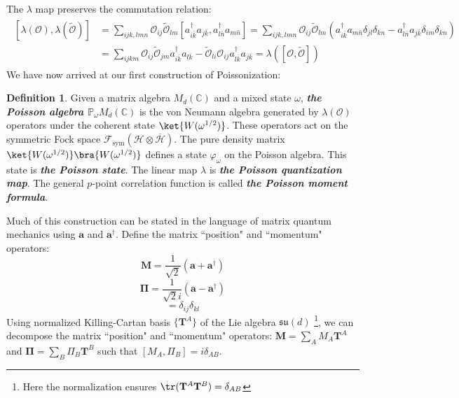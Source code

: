 \documentclass[a4paper,11pt]{article}
\theoremstyle{definition}
\newtheorem{definition}{Definition}[section]
\numberwithin{equation}{section}
\newcommand{\lb}{\left(}
\newcommand{\rb}{\right)}
\begin{document}
The $\lambda$ map preserves the commutation relation:
\begin{align}
    \begin{split}
        [\lambda(\mathcal{O}), \lambda(\widetilde{\mathcal{O}})] &= \sum_{ijk,lmn}\mathcal{O}_{ij}\widetilde{\mathcal{O}}_{lm}[a^\dagger_{i\bar{k}}a_{j\bar{k}}, a^\dagger_{l\bar{n}}a_{m\bar{n}}] = \sum_{ijk,lmn}\mathcal{O}_{ij}\widetilde{\mathcal{O}}_{lm}\lb a^\dagger_{i\bar{k}}a_{m\bar{n}}\delta_{jl}\delta_{kn} - a^\dagger_{l\bar{n}}a_{j\bar{k}}\delta_{im}\delta_{kn}\rb
        \\&
        =\sum_{ijkm}\mathcal{O}_{ij}\widetilde{\mathcal{O}}_{jm}a^\dagger_{i\bar{k}}a_{l\bar{k}} - \widetilde{\mathcal{O}}_{li}\mathcal{O}_{ij}a^\dagger_{l\bar{k}}a_{j\bar{k}} = \lambda([\mathcal{O}, \widetilde{\mathcal{O}}])
    \end{split}
\end{align}
We have now arrived at our first construction of Poissonization:
\begin{definition}
    Given a matrix algebra $M_d(\mathbb{C})$ and a mixed state $\omega$, \textbf{\textit{the Poisson algebra $\mathbb{P}_\omega M_d(\mathbb{C})$}} is the von Neumann algebra generated by $\lambda(\mathcal{O})$ operators under the coherent state $\ket{W(\omega^{1/2})}$. These operators act on the symmetric Fock space $\mathcal{F}_\text{sym}(\mathcal{H}\otimes\overline{\mathcal{H}})$. The pure density matrix $\ket{W(\omega^{1/2})}\bra{W(\omega^{1/2})}$ defines a state $\varphi_\omega$ on the Poisson algebra. This state is \textbf{\textit{the Poisson state}}. The linear map $\lambda$ is \textbf{\textit{the Poisson quantization map}}. The general $p$-point correlation function is called \textbf{\textit{the Poisson moment formula}}.
\end{definition}
Much of this construction can be stated in the language of matrix quantum mechanics using $\textbf{a}$ and $\textbf{a}^\dagger$. Define the matrix ``position" and ``momentum" operators:
\begin{equation}
    \mathbf{M} = \frac{1}{\sqrt{2}}\lb\mathbf{a} + \mathbf{a}^\dagger\rb
\end{equation}
\begin{equation}
    \mathbf{\Pi} = \frac{1}{\sqrt{2}i}\lb \mathbf{a} - \mathbf{a}^\dagger\rb
\end{equation}
\begin{equation}
    [\mathbf{M}_{ik}, \mathbf{\Pi}_{jl}] = \delta_{ij}\delta_{kl}
\end{equation}
Using normalized Killing-Cartan basis $\{\mathbf{T}^A\}$ of the Lie algebra $\mathfrak{su}(d)$ \footnote{Here the normalization ensures $\tr(\mathbf{T}^A\mathbf{T}^B) = \delta_{AB}$}, we can decompose the matrix ``position" and ``momentum" operators: $\mathbf{M} = \sum_A M_A\mathbf{T}^A$ and $\mathbf{\Pi} = \sum_B\Pi_B\mathbf{T}^B$ such that $[M_A, \Pi_B] = i\delta_{AB}$. 
\end{document}
